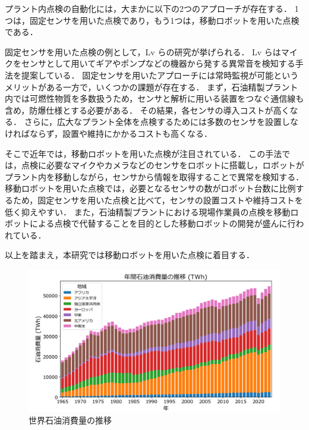 \documentclass[../main]{subfiles}
\begin{document}
プラント内点検の自動化には，大まかに以下の2つのアプローチが存在する．
1つは，固定センサを用いた点検であり，もう1つは，移動ロボットを用いた点検である．

固定センサを用いた点検の例として，Lv らの研究が挙げられる\cite{Lv2023Overview}．
Lv らはマイクをセンサとして用いてギアやポンプなどの機器から発する異常音を検知する手法を提案している．
固定センサを用いたアプローチには常時監視が可能というメリットがある一方で，いくつかの課題が存在する．
まず，石油精製プラント内では可燃性物質を多数扱うため，センサと解析に用いる装置をつなぐ通信線も含め，防爆仕様とする必要がある．
その結果，各センサの導入コストが高くなる．
さらに，広大なプラント全体を点検するためには多数のセンサを設置しなければならず，設置や維持にかかるコストも高くなる．


そこで近年では，移動ロボットを用いた点検が注目されている．
この手法では，点検に必要なマイクやカメラなどのセンサをロボットに搭載し，ロボットがプラント内を移動しながら，センサから情報を取得することで異常を検知する．
移動ロボットを用いた点検では，必要となるセンサの数がロボット台数に比例するため，固定センサを用いた点検と比べて，センサの設置コストや維持コストを低く抑えやすい．
また，石油精製プラントにおける現場作業員の点検を移動ロボットによる点検で代替することを目的とした移動ロボットの開発が盛んに行われている\cite{Shukutani2018}．

以上を踏まえ，本研究では移動ロボットを用いた点検に着目する．

\begin{figure}[t]
  \centering
  \includegraphics[keepaspectratio, width=1.0\linewidth]{chap1/oil_consumption.png}
  \caption{世界石油消費量の推移}
  \label{fig:oil_consumption}
\end{figure}
\end{document}
